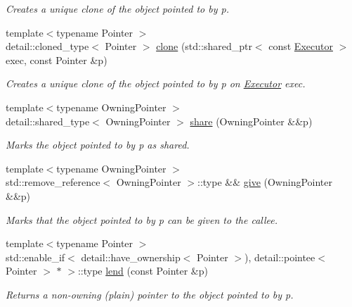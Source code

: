 \begin{DoxyCompactItemize}
\begin{DoxyCompactList}\small\item\em Creates a unique clone of the object pointed to by {\ttfamily p}. \end{DoxyCompactList}\item 
{\footnotesize template$<$typename Pointer $>$ }\\detail\+::cloned\+\_\+type$<$ Pointer $>$ \hyperlink{namespacegko_a13b00a9dd24aa08d4495762d89f3762a}{clone} (std\+::shared\+\_\+ptr$<$ const \hyperlink{classgko_1_1Executor}{Executor} $>$ exec, const Pointer \&p)
\begin{DoxyCompactList}\small\item\em Creates a unique clone of the object pointed to by {\ttfamily p} on \hyperlink{classgko_1_1Executor}{Executor} {\ttfamily exec}. \end{DoxyCompactList}\item 
{\footnotesize template$<$typename Owning\+Pointer $>$ }\\detail\+::shared\+\_\+type$<$ Owning\+Pointer $>$ \hyperlink{namespacegko_a3ce296f73db0ff398bdea6009a3a5c58}{share} (Owning\+Pointer \&\&p)
\begin{DoxyCompactList}\small\item\em Marks the object pointed to by {\ttfamily p} as shared. \end{DoxyCompactList}\item 
{\footnotesize template$<$typename Owning\+Pointer $>$ }\\std\+::remove\+\_\+reference$<$ Owning\+Pointer $>$\+::type \&\& \hyperlink{namespacegko_acbd3fd6d07e498892881e8e2ab0b4167}{give} (Owning\+Pointer \&\&p)
\begin{DoxyCompactList}\small\item\em Marks that the object pointed to by {\ttfamily p} can be given to the callee. \end{DoxyCompactList}\item 
{\footnotesize template$<$typename Pointer $>$ }\\std\+::enable\+\_\+if$<$ detail\+::have\+\_\+ownership$<$ Pointer $>$), detail\+::pointee$<$ Pointer $>$ $\ast$ $>$\+::type \hyperlink{namespacegko_aa8cb4876b72e5e1036ea9575443c439b}{lend} (const Pointer \&p)
\begin{DoxyCompactList}\small\item\em Returns a non-\/owning (plain) pointer to the object pointed to by {\ttfamily p}. \end{DoxyCompactList}\item 

\end{DoxyCompactItemize}

